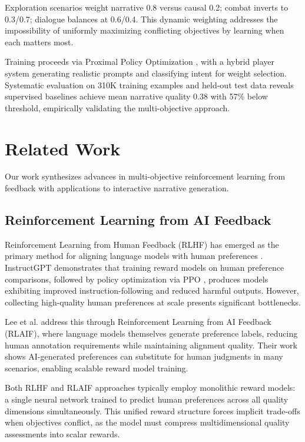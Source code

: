 \documentclass[11pt]{article}
\begin{document}
Exploration scenarios weight narrative 0.8 versus causal 0.2; combat inverts to 0.3/0.7; dialogue balances at 0.6/0.4. This dynamic weighting addresses the impossibility of uniformly maximizing conflicting objectives by learning when each matters most.

Training proceeds via Proximal Policy Optimization \cite{schulman2017proximal}, with a hybrid player system generating realistic prompts and classifying intent for weight selection. Systematic evaluation on 310K training examples and held-out test data reveals supervised baselines achieve mean narrative quality 0.38 with 57\% below threshold, empirically validating the multi-objective approach.

\section{Related Work}

Our work synthesizes advances in multi-objective reinforcement learning from feedback with applications to interactive narrative generation.

\subsection{Reinforcement Learning from AI Feedback}

Reinforcement Learning from Human Feedback (RLHF) has emerged as the primary method for aligning language models with human preferences \cite{ouyang2022training}. InstructGPT demonstrates that training reward models on human preference comparisons, followed by policy optimization via PPO \cite{schulman2017proximal}, produces models exhibiting improved instruction-following and reduced harmful outputs. However, collecting high-quality human preferences at scale presents significant bottlenecks.

Lee et al. \cite{lee2023rlaif} address this through Reinforcement Learning from AI Feedback (RLAIF), where language models themselves generate preference labels, reducing human annotation requirements while maintaining alignment quality. Their work shows AI-generated preferences can substitute for human judgments in many scenarios, enabling scalable reward model training.

Both RLHF and RLAIF approaches typically employ monolithic reward models: a single neural network trained to predict human preferences across all quality dimensions simultaneously. This unified reward structure forces implicit trade-offs when objectives conflict, as the model must compress multidimensional quality assessments into scalar rewards.
\end{document}
